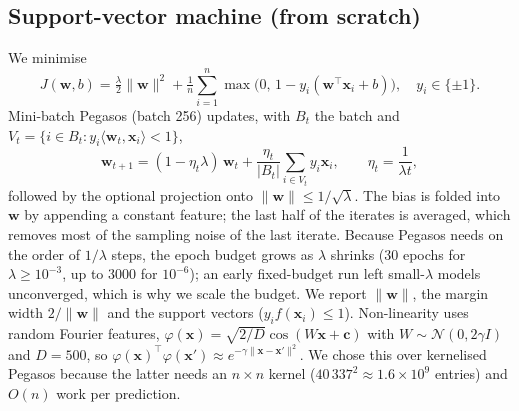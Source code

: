 \documentclass[10pt,twocolumn,a4paper]{article}
\begin{document}
\subsection{Support-vector machine (from scratch)}
We minimise
\begin{equation}
  J(\mathbf{w},b)=\tfrac{\lambda}{2}\lVert\mathbf{w}\rVert^{2}
  +\tfrac{1}{n}\sum_{i=1}^{n}\max\!\big(0,\,1-y_i(\mathbf{w}^{\top}\mathbf{x}_i+b)\big),\quad y_i\in\{\pm1\}.
  \label{eq:J}
\end{equation}
Mini-batch Pegasos (batch 256) updates, with $B_t$ the batch and $V_t=\{i\in B_t: y_i\langle\mathbf{w}_t,\mathbf{x}_i\rangle<1\}$,
\begin{equation}
  \mathbf{w}_{t+1}=(1-\eta_t\lambda)\,\mathbf{w}_t+\frac{\eta_t}{|B_t|}\sum_{i\in V_t}y_i\mathbf{x}_i,\qquad \eta_t=\frac1{\lambda t},
\end{equation}
followed by the optional projection onto $\lVert\mathbf{w}\rVert\le1/\sqrt{\lambda}$. The bias is folded into $\mathbf{w}$ by appending a constant feature;
the last half of the iterates is averaged, which removes most of the sampling noise of the last iterate. Because Pegasos needs on the order of
$1/\lambda$ steps, the epoch budget grows as $\lambda$ shrinks (30 epochs for $\lambda\ge10^{-3}$, up to 3000 for $10^{-6}$); an early
fixed-budget run left small-$\lambda$ models unconverged, which is why we scale the budget.
We report $\lVert\mathbf{w}\rVert$, the margin width $2/\lVert\mathbf{w}\rVert$ and the support vectors ($y_i f(\mathbf{x}_i)\le1$).
Non-linearity uses random Fourier features, $\varphi(\mathbf{x})=\sqrt{2/D}\cos(W\mathbf{x}+\mathbf{c})$ with $W\sim\mathcal N(0,2\gamma I)$ and $D=500$,
so $\varphi(\mathbf{x})^\top\varphi(\mathbf{x}')\approx e^{-\gamma\lVert\mathbf{x}-\mathbf{x}'\rVert^2}$. We chose this over kernelised Pegasos because the latter needs an $n\times n$ kernel
($40\,337^2\approx1.6\times10^9$ entries) and $O(n)$ work per prediction.
\end{document}
